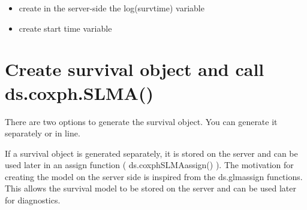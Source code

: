 \documentclass[
]{book}
\newenvironment{Shaded}{\begin{snugshade}}{\end{snugshade}}
\newcommand{\DataTypeTok}[1]{\textcolor[rgb]{0.13,0.29,0.53}{#1}}
\newcommand{\KeywordTok}[1]{\textcolor[rgb]{0.13,0.29,0.53}{\textbf{#1}}}
\newcommand{\NormalTok}[1]{#1}
\newcommand{\StringTok}[1]{\textcolor[rgb]{0.31,0.60,0.02}{#1}}
\providecommand{\tightlist}{%
  \setlength{\itemsep}{0pt}\setlength{\parskip}{0pt}}
\begin{document}
\begin{itemize}
\tightlist
\item
  create in the server-side the log(survtime) variable
\end{itemize}

\begin{Shaded}
\end{Shaded}

\begin{itemize}
\tightlist
\item
  create start time variable
\end{itemize}

\begin{Shaded}
\end{Shaded}

\hypertarget{create-survival-object-and-call-ds.coxph.slma}{%
\section{Create survival object and call ds.coxph.SLMA()}\label{create-survival-object-and-call-ds.coxph.slma}}

There are two options to generate the survival object. You can generate it separately or in line.

If a survival object is generated separately, it is stored on the server and can be used later in an assign function ( ds.coxphSLMAassign() ). The motivation for creating the model on the server side is inspired from the ds.glmassign functions. This allows the survival model to be stored on the server and can be used later for diagnostics.
\end{document}
